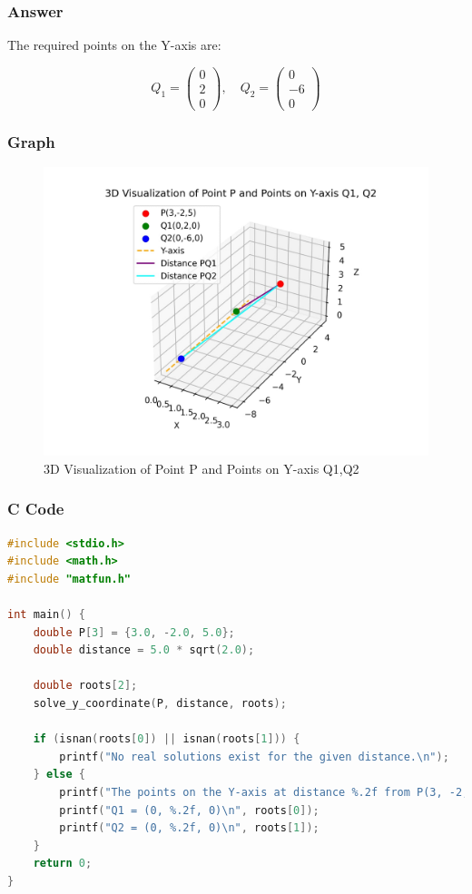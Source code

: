 \documentclass{beamer}
\theoremstyle{remark}
\numberwithin{equation}{section}
\numberwithin{equation}{section}
\begin{document}
\begin{frame}
\frametitle{Answer}

The required points on the Y-axis are:

\[
Q_1 = \begin{pmatrix} 0 \\ 2 \\ 0 \end{pmatrix}, \quad Q_2 = \begin{pmatrix} 0 \\ -6 \\ 0 \end{pmatrix}
\]

\end{frame}
\begin{frame}
    \frametitle{Graph}
    \begin{figure}[h!]
        \centering
        \includegraphics[width=0.7\linewidth]{FIG/graph.png}
        \caption{3D Visualization of Point P and Points on Y-axis Q1,Q2}
    \end{figure}
\end{frame}
\begin{frame}[fragile]
\frametitle{C Code }
\begin{lstlisting}[language=C]
#include <stdio.h>
#include <math.h>
#include "matfun.h"

int main() {
    double P[3] = {3.0, -2.0, 5.0};
    double distance = 5.0 * sqrt(2.0);

    double roots[2];
    solve_y_coordinate(P, distance, roots);

    if (isnan(roots[0]) || isnan(roots[1])) {
        printf("No real solutions exist for the given distance.\n");
    } else {
        printf("The points on the Y-axis at distance %.2f from P(3, -2, 5) are:\n", distance);
        printf("Q1 = (0, %.2f, 0)\n", roots[0]);
        printf("Q2 = (0, %.2f, 0)\n", roots[1]);
    }
    return 0;
}

\end{lstlisting}
\end{frame}
\end{document}
